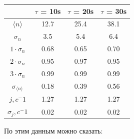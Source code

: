 \documentclass[12pt, a4paper]{article}
\begin{document}
\begin{center}
    \begin{tabular}{|c|c|c|c|}

        \hline
        
        & $\tau$ = 10s & $\tau$ = 20s & $\tau$ = 30s \\

        \hline

        $\langle n \rangle$ & 12.7 & 25.4 & 38.1 \\

        \hline

        $\sigma_n$ & 3.5 & 5.4 & 6.4 \\

        \hline

        $1 \cdot \sigma_n$ & 0.68 & 0.65 & 0.70 \\

        \hline

        $2 \cdot \sigma_n$ & 0.95 & 0.97 & 0.95 \\

        \hline

        $3 \cdot \sigma_n$ & 0.99 & 0.99 & 0.99 \\

        \hline

        $\sigma_{\langle n \rangle}$ &
        0.18 & 0.39 & 0.56 \\

        \hline

        $j, c^-1$ & 1.27 & 1.27 & 1.27 \\

        \hline

        $\sigma_j, c^-1$ & 0.02 & 0.02 & 0.02 \\

        \hline

    \end{tabular}
\end{center}

По этим данным можно сказать:
\end{document}

